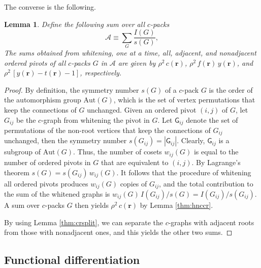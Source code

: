 \documentclass[preprint]{revtex4-1}
\newtheorem{lemm}[thrm]{Lemma}
\newcommand{\vct}[1]{\mathbf{#1}}
\providecommand{\vr}{} %
\renewcommand{\vr}{\vct{r}}
\newcommand{\A}{\mathcal{A}}
\newcommand{\G}{\mathsf{G}}
\newcommand{\Aut}{\mathrm{Aut}}
\begin{document}


The converse is the following.


\begin{lemm}
Define the following sum over all $c$-packs
\begin{equation}
  \A \equiv \sum_G \frac{ I(G) }{ s(G) },
  \label{eq:Adef}
\end{equation}
The sums obtained from whitening,
one at a time,
all,
adjacent,
and nonadjacent
ordered pivots
of all $c$-packs $G$ in $\A$
are given by
$\rho^2 \, c(\vr)$,
$\rho^2 \, f(\vr) \, y(\vr)$,
and
$\rho^2 \, [y(\vr) - t(\vr) - 1]$,
respectively.
\label{thm:whitenAhnc}
\end{lemm}



\begin{proof}
By definition,
  the symmetry number $s(G)$
  of a $c$-pack $G$
  is the order of the automorphism group $\Aut(G)$,
  which is the set of vertex permutations
  that keep the connections of $G$ unchanged.
%
Given an ordered pivot $(i, j)$ of $G$,
  let $G_{ij}$ be the $c$-graph
  from whitening the pivot in $G$.
%
Let $\G_{ij}$
  denote the set of permutations of the non-root vertices
  that keep the connections of $G_{ij}$ unchanged,
then the symmetry number $s(G_{ij}) = |\G_{ij}|$.
%
Clearly, $\G_{ij}$ is a subgroup of $\Aut(G)$.
%
%
Thus, the number of cosets $w_{ij}(G)$
is equal to the number of ordered pivots in $G$
that are equivalent to $(i, j)$.
%
By Lagrange's theorem $s(G) = s(G_{ij}) \, w_{ij}(G)$.
%
It follows that the procedure of whitening all ordered pivots
produces $w_{ij}(G)$ copies of $G_{ij}$,
and the total contribution
to the sum of the whitened graphs
is $w_{ij}(G) \, I(G_{ij})/s(G) = I(G_{ij})/s(G_{ij})$.
%
A sum over $c$-packs $G$
then yields $\rho^2 \, c(\vr)$ by Lemma \ref{thm:hnccr}.

By using Lemma \ref{thm:crsplit},
  we can separate the $c$-graphs with adjacent roots
  from those with nonadjacent ones,
  and this yields the other two sums.
\end{proof}



\subsection{Functional differentiation}
\end{document}
